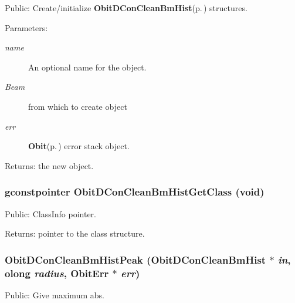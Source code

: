 Public: Create/initialize {\bf Obit\-DCon\-Clean\-Bm\-Hist}{\rm (p.\,\pageref{structObitDConCleanBmHist})} structures. 

\begin{Desc}
\item[Parameters:]
\begin{description}
\item[{\em name}]An optional name for the object. \item[{\em Beam}]from which to create object \item[{\em err}]{\bf Obit}{\rm (p.\,\pageref{structObit})} error stack object. \end{description}
\end{Desc}
\begin{Desc}
\item[Returns:]the new object. \end{Desc}
\subsubsection{\setlength{\rightskip}{0pt plus 5cm}gconstpointer Obit\-DCon\-Clean\-Bm\-Hist\-Get\-Class (void)}\label{ObitDConCleanBmHist_8h_a6}


Public: Class\-Info pointer. 

\begin{Desc}
\item[Returns:]pointer to the class structure. \end{Desc}
\subsubsection{ Obit\-DCon\-Clean\-Bm\-Hist\-Peak ({\bf Obit\-DCon\-Clean\-Bm\-Hist} $\ast$ {\em in}, {\bf olong} {\em radius}, {\bf Obit\-Err} $\ast$ {\em err})}\label{ObitDConCleanBmHist_8h_a10}


Public: Give maximum abs. 

